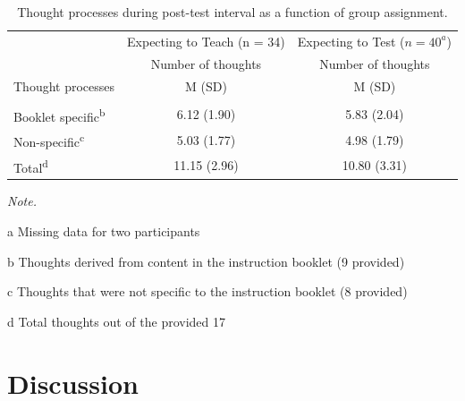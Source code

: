 \documentclass[
  english,
  man,floatsintext]{apa7}
\begin{document}
\begin{table}

\caption{\label{tab:table5}Thought processes during post-test interval as a function of group assignment.}
\fontsize{11}{13}\selectfont
\begin{threeparttable}
\begin{tabular}[t]{lcc}
\toprule
\multicolumn{1}{c}{ } & \multicolumn{1}{c}{Expecting to Teach (n = 34)} & \multicolumn{1}{c}{Expecting to Test ($n = 40^{a}$)} \\
\cmidrule(l{3pt}r{3pt}){2-2} \cmidrule(l{3pt}r{3pt}){3-3}
\multicolumn{1}{c}{ } & \multicolumn{1}{c}{Number of thoughts} & \multicolumn{1}{c}{Number of thoughts} \\
\cmidrule(l{3pt}r{3pt}){2-2} \cmidrule(l{3pt}r{3pt}){3-3}
Thought processes & M (SD) & M (SD)\\
\midrule
\addlinespace[0.3em]
\multicolumn{3}{l}{\textbf{Engaged in thoughts}}\\
\hspace{1em}Booklet specific\textsuperscript{b} & 6.12 (1.90) & 5.83 (2.04)\\
\hspace{1em}Non-specific\textsuperscript{c} & 5.03 (1.77) & 4.98 (1.79)\\
\hspace{1em}Total\textsuperscript{d} & 11.15 (2.96) & 10.80 (3.31)\\
\bottomrule
\end{tabular}
\begin{tablenotes}
\item \textit{Note.} 
\item[a] Missing data for two participants
\item[b] Thoughts derived from content in the instruction booklet (9 provided)
\item[c] Thoughts that were not specific to the instruction booklet (8 provided)
\item[d] Total thoughts out of the provided 17
\end{tablenotes}
\end{threeparttable}
\end{table}

\vspace{2em}

\hypertarget{discussion}{%
\section{Discussion}\label{discussion}}
\end{document}
